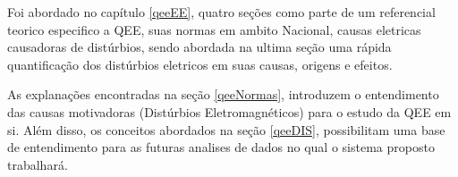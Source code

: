 \par 
{}
Foi abordado no capítulo \ref{qeeEE}, quatro seções como parte de um referencial teorico especifico a QEE, suas normas em ambito Nacional, causas eletricas causadoras de distúrbios, sendo abordada na ultima seção uma rápida quantificação dos distúrbios eletricos em suas causas, origens e efeitos.
\par
As explanações encontradas na seção \ref{qeeNormas}, introduzem o entendimento das causas motivadoras (Distúrbios Eletromagnéticos) para o estudo da QEE em si. Além disso, os conceitos abordados na seção \ref{qeeDIS}, possibilitam uma base de entendimento para as futuras analises de dados no qual o sistema proposto trabalhará.